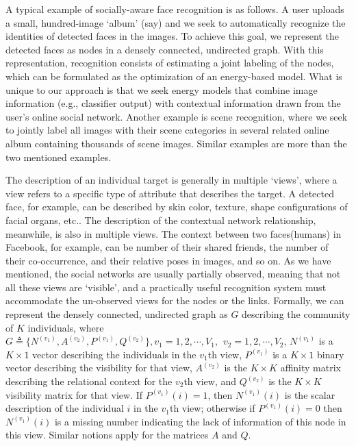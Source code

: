 A typical example of socially-aware face recognition is as follows. A user uploads a small, hundred-image `album' (say)  and we seek to automatically recognize the identities of detected faces in the images. To achieve this goal, we represent the detected faces as nodes in a densely connected, undirected graph. With this representation, recognition consists of estimating a joint labeling of the nodes, which can be formulated as the optimization of an energy-based model. What is unique to our approach is that we seek energy models that combine image information (e.g., classifier output) with contextual information drawn from the user's online social network. Another example is scene recognition, where we seek to jointly label all images with their scene categories in several related online album containing thousands of scene images. Similar examples are more than the two mentioned examples.

The description of an individual target is generally in multiple `views', where a view refers to a specific type of attribute that describes the target. A detected face, for example, can be described by skin color, texture, shape configurations of facial organs, etc.. The description of the contextual network relationship, meanwhile, is also in multiple views. The context between two faces(humans) in Facebook, for example, can be number of their shared friends, the number of their co-occurrence, and their relative poses in images, and so on. As we have mentioned, the social networks are usually partially observed, meaning that not all these views are `visible', and a practically useful recognition system must accommodate the un-observed views for the nodes or the links. Formally,  we can represent  the densely connected, undirected graph as $G$ describing the community of $K$ individuals, where $G\triangleq\{N^{(v_1)},A^{(v_2)},P^{(v_1)}, Q^{(v_2)}\}, v_1=1,2,\cdots,V_1,\hspace{5pt} v_2=1,2,\cdots,V_2$,  $N^{(v_1)}$ is a $K\times 1$ vector describing the individuals in the $v_1$th view, $P^{(v_1)}$ is a $K\times 1$ binary vector describing the visibility for that view, $A^{(v_2)}$ is the $K\times K$ affinity matrix describing the relational context for the $v_2$th view, and $Q^{(v_2)}$ is the $K\times K$ visibility matrix for that view. If $P^{(v_1)}(i)=1$, then $N^{(v_1)}(i)$ is the scalar description of the individual $i$ in the $v_1$th view; otherwise if $P^{(v_1)}(i)=0$ then $N^{(v_1)}(i)$ is a missing number indicating the lack of information of this node in this view. Similar notions apply for the matrices $A$ and $Q$.


